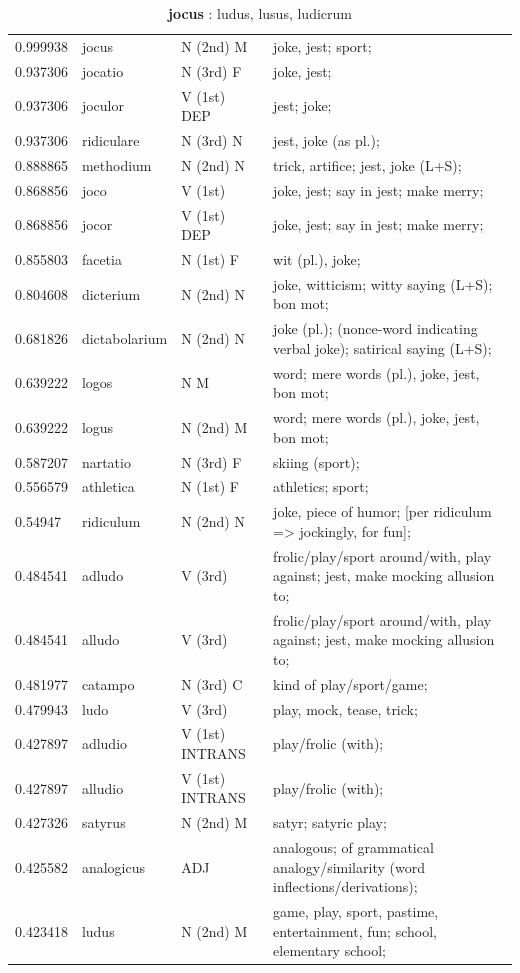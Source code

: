 \documentclass[]{article}
\begin{document}
	\begin{table}
	\caption{\textbf{jocus} : ludus, lusus, ludicrum \label{jocus}}
	\vspace{.25in}
	\begin{tabular}{l|lll}
	   0.999938 & jocus & N (2nd) M & joke, jest; sport;\\
	   0.937306 & jocatio & N (3rd) F & joke, jest;\\
	   0.937306 & joculor & V (1st) DEP & jest; joke;\\
	   0.937306 & ridiculare & N (3rd) N & jest, joke (as pl.);\\
	   0.888865 & methodium & N (2nd) N & trick, artifice; jest, joke (L+S);\\
	   0.868856 & joco & V (1st) & joke, jest; say in jest; make merry;\\
	   0.868856 & jocor & V (1st) DEP & joke, jest; say in jest; make merry;\\
	   0.855803 & facetia & N (1st) F & wit (pl.), joke;\\
	   0.804608 & dicterium & N (2nd) N & joke, witticism; witty saying (L+S); bon mot;\\
	   0.681826 & dictabolarium & N (2nd) N & joke (pl.); (nonce-word indicating verbal joke); satirical saying (L+S);\\
	   0.639222 & logos & N M & word; mere words (pl.), joke, jest, bon mot;\\
	   0.639222 & logus & N (2nd) M & word; mere words (pl.), joke, jest, bon mot;\\
	   0.587207 & nartatio & N (3rd) F & skiing (sport);\\
	   0.556579 & athletica & N (1st) F & athletics; sport;\\
	   0.54947 & ridiculum & N (2nd) N & joke, piece of humor; [per ridiculum => jockingly, for fun];\\
	   0.484541 & adludo & V (3rd) & frolic/play/sport around/with, play against; jest, make mocking allusion to;\\
	   0.484541 & alludo & V (3rd) & frolic/play/sport around/with, play against; jest, make mocking allusion to;\\
	   0.481977 & catampo & N (3rd) C & kind of play/sport/game;\\
	   0.479943 & ludo & V (3rd) & play, mock, tease, trick;\\
	   0.427897 & adludio & V (1st) INTRANS & play/frolic (with);\\
	   0.427897 & alludio & V (1st) INTRANS & play/frolic (with);\\
	   0.427326 & satyrus & N (2nd) M & satyr; satyric play;\\
	   0.425582 & analogicus & ADJ & analogous; of grammatical analogy/similarity (word inflections/derivations);\\
	   0.423418 & ludus & N (2nd) M & game, play, sport, pastime, entertainment, fun; school, elementary school;\\
	\end{tabular}
	\end{table}
\end{document}
